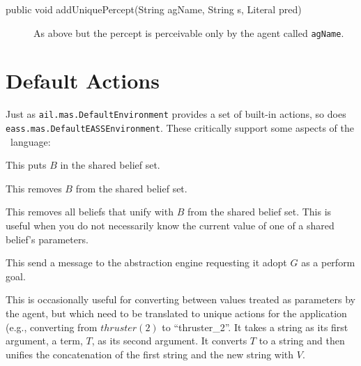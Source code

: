 \begin{sloppypar}
\begin{description}
\item[public void addUniquePercept(String agName, String s, Literal  pred)] As above but the percept is perceivable only by the agent called \texttt{agName}.
\end{description}
\end{sloppypar}

\section{Default Actions}
Just as \texttt{ail.mas.DefaultEnvironment} provides a set of built-in actions, so does \texttt{eass.mas.DefaultEASSEnvironment}.  These critically support some aspects of the \eass\ language:

\begin{description}
\item[assert\_shared(B)] This puts $B$ in the shared belief set.
\item[remove\_shared(B)] This removes $B$ from the shared belief set.
\item[remove\_shared\_unifies(B)] This removes all beliefs that unify with $B$ from the shared belief set.  This is useful when you do not necessarily know the current value of one of a shared belief's parameters.
\item[perf(G)] This send a message to the abstraction engine requesting it adopt $G$ as a perform goal.
\item[append\_string\_pred(S, T, V)] This is occasionally useful for converting between values treated as parameters by the agent, but which need to be translated to unique actions for the application (e.g., converting from $thruster(2)$ to ``thruster\_2''.  It takes a string as its first argument, a term, $T$, as its second argument.  It converts $T$ to a string and then unifies the concatenation of the first string and the new string with $V$.
\end{description}

